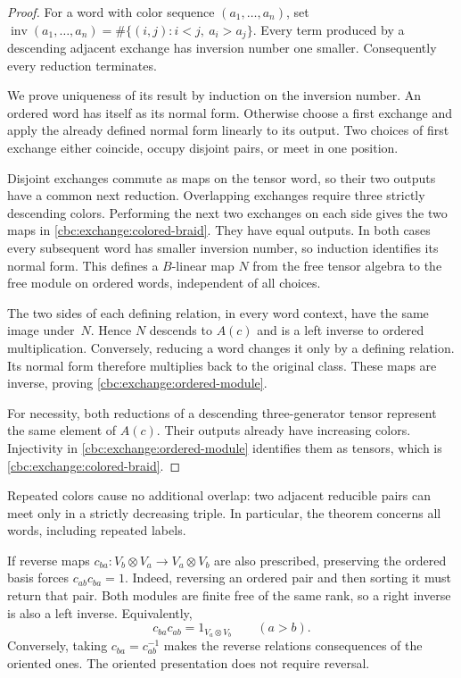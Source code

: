 \begin{proof}
For a word with color sequence $(a_1,\ldots,a_n)$, set
$\operatorname{inv}(a_1,\ldots,a_n)
 =\#\{(i,j):i<j,\ a_i>a_j\}$.
Every term produced by a descending adjacent exchange has inversion number
one smaller.  Consequently every reduction terminates.

We prove uniqueness of its result by induction on the inversion number.
An ordered word has itself as its normal form.  Otherwise choose a first
exchange and apply the already defined normal form linearly to its output.
Two choices of first exchange either coincide, occupy disjoint pairs, or
meet in one position.

Disjoint exchanges commute as maps on the tensor
word, so their two outputs have a common next reduction.  Overlapping
exchanges require three strictly descending colors.  Performing the next
two exchanges on each side gives the two maps in
\eqref{cbc:exchange:colored-braid}.  They have equal outputs.  In both
cases every subsequent word has smaller inversion number, so induction
identifies its normal form.  This defines a $B$-linear map $N$ from the
free tensor algebra to the free module on ordered words, independent of
all choices.

The two sides of each defining relation, in every word context, have the
same image under~$N$.  Hence $N$ descends to $A(c)$ and is a left inverse
to ordered multiplication.  Conversely, reducing a word changes it only by a defining relation.
Its normal form therefore multiplies back to the original class.  These maps are inverse, proving
\eqref{cbc:exchange:ordered-module}.

For necessity, both reductions of a descending three-generator tensor
represent the same element of $A(c)$.  Their outputs already have increasing
colors.  Injectivity in \eqref{cbc:exchange:ordered-module} identifies
them as tensors, which is \eqref{cbc:exchange:colored-braid}.
\end{proof}

Repeated colors cause no additional overlap: two adjacent reducible pairs
can meet only in a strictly decreasing triple.  In particular, the theorem
concerns all words, including repeated labels.

If reverse maps $c_{ba}:V_b\otimes V_a\to V_a\otimes V_b$ are also
prescribed, preserving the ordered basis forces $c_{ab}c_{ba}=1$.
Indeed, reversing an ordered pair and then sorting it must return that pair.
Both modules are finite free of the same rank, so a right inverse is also
a left inverse.  Equivalently,
\begin{equation}\label{cbc:exchange:reverse}
 c_{ba}c_{ab}=1_{V_a\otimes V_b}\qquad(a>b).
\end{equation}
Conversely, taking $c_{ba}=c_{ab}^{-1}$ makes the reverse relations
consequences of the oriented ones.  The oriented presentation does not require reversal.

